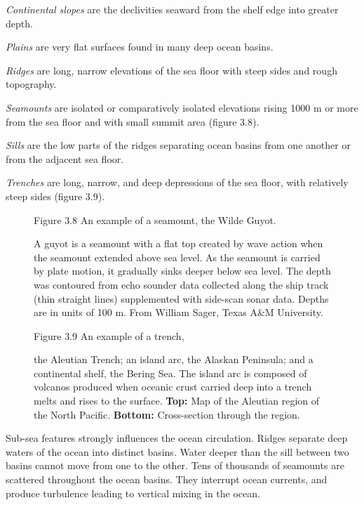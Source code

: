 \textit{Continental slopes} are the declivities
seaward from the shelf edge into greater depth.

\textit{Plains} are very flat surfaces found in many deep ocean
basins.

\textit{Ridges} are long, narrow elevations of the sea floor with steep
sides and rough topography.

\textit{Seamounts} are isolated or comparatively isolated
elevations rising 1000 m or more from the sea floor and with small summit area (figure 3.8).

\textit{Sills} are the low parts of the ridges separating ocean basins from one another or from
the adjacent sea floor.

\textit{Trenches} are long, narrow, and deep depressions of the sea floor, with relatively
steep sides (figure 3.9).

\begin{figure}[t!]
\footnotesize
Figure 3.8 An example of a seamount, the Wilde Guyot.\rule{0pt}{4ex} A guyot is
a seamount with a flat top created by wave action when the seamount
extended above sea level. As the seamount is carried by plate motion, it
gradually sinks deeper below sea level. The depth was contoured from echo
sounder data collected along the ship track (thin straight lines) supplemented
with side-scan sonar data. Depths are in units of 100 m. From William Sager, Texas A\&M
University.
\label{fig:wildeguyot}
\vspace{-3ex}
\end{figure}

\begin{figure}[t!]
\footnotesize
Figure 3.9 An example of a trench, \rule{0pt}{3ex}the Aleutian Trench; an island
arc, the Alaskan Peninsula; and a continental shelf, the Bering Sea. The island arc
is composed of volcanos produced when oceanic crust carried deep into a trench
melts and rises to the surface. \textbf{Top:} Map of the Aleutian region of the
North Pacific.
\textbf{Bottom:} Cross-section through the region.
\label{fig:aleutiantrench}
\vspace{-4ex}
\end{figure}

Sub-sea features strongly influences the ocean circulation.
Ridges separate deep waters of the ocean into distinct basins. Water deeper than the
sill between two basins cannot move from one to the other. Tens of thousands of
seamounts are scattered throughout the ocean basins. They interrupt ocean currents, and produce
turbulence leading to vertical mixing in
the ocean.

